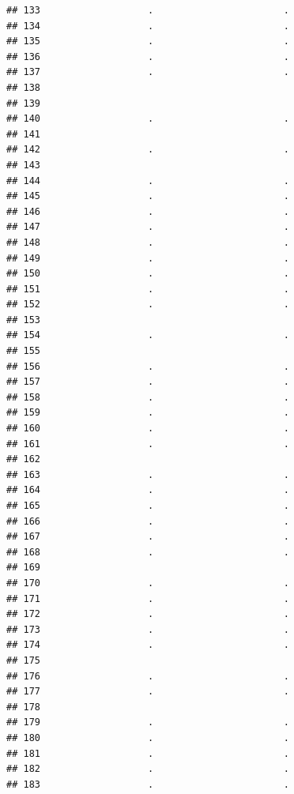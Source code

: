 \documentclass[
]{article}
\begin{document}
\begin{verbatim}
## 133                   .                       .
## 134                   .                       .
## 135                   .                       .
## 136                   .                       .
## 137                   .                       .
## 138                                            
## 139                                            
## 140                   .                       .
## 141                                            
## 142                   .                       .
## 143                                            
## 144                   .                       .
## 145                   .                       .
## 146                   .                       .
## 147                   .                       .
## 148                   .                       .
## 149                   .                       .
## 150                   .                       .
## 151                   .                       .
## 152                   .                       .
## 153                                            
## 154                   .                       .
## 155                                            
## 156                   .                       .
## 157                   .                       .
## 158                   .                       .
## 159                   .                       .
## 160                   .                       .
## 161                   .                       .
## 162                                            
## 163                   .                       .
## 164                   .                       .
## 165                   .                       .
## 166                   .                       .
## 167                   .                       .
## 168                   .                       .
## 169                                            
## 170                   .                       .
## 171                   .                       .
## 172                   .                       .
## 173                   .                       .
## 174                   .                       .
## 175                                            
## 176                   .                       .
## 177                   .                       .
## 178                                            
## 179                   .                       .
## 180                   .                       .
## 181                   .                       .
## 182                   .                       .
## 183                   .                       .

\end{verbatim}
\end{document}
